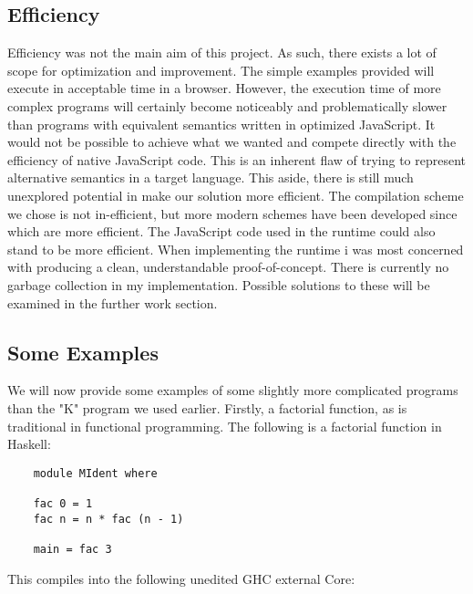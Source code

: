 \subsection{Efficiency}
Efficiency was not the main aim of this project. As such, there
exists a lot of scope for optimization and improvement. The simple
examples provided will execute in acceptable time in a browser. 
However, the execution time of more complex programs will certainly 
become noticeably and problematically slower than programs with 
equivalent semantics written in optimized JavaScript. It would 
not be possible to achieve what we wanted and compete directly with
the efficiency of native JavaScript code. This is an inherent flaw
of trying to represent alternative semantics in a target language.
This aside, there is still much unexplored potential in make our
solution more efficient. The compilation scheme we chose is not
in-efficient, but more modern schemes have been developed since
which are more efficient. The JavaScript code used in the runtime
could also stand to be more efficient. When implementing the 
runtime i was most concerned with producing a clean, understandable
proof-of-concept. There is currently no garbage collection in my
implementation. Possible solutions to these will be examined in
the further work section.

\subsection{Some Examples}
We will now provide some examples of some slightly more complicated
programs than the "K" program we used earlier. Firstly, a
factorial function, as is traditional in functional programming. The
following is a factorial function in Haskell:

\begin{verbatim}
    module MIdent where

    fac 0 = 1
    fac n = n * fac (n - 1)

    main = fac 3
\end{verbatim}

This compiles into the following unedited GHC external Core:

